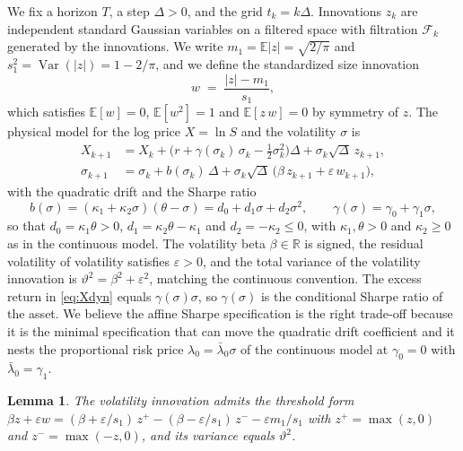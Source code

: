 \documentclass[11pt]{article}
\newtheorem{lemma}[theorem]{Lemma}
\theoremstyle{remark}
\newcommand{\E}{\mathbb{E}}
\newcommand{\R}{\mathbb{R}}
\newcommand{\Dt}{\Delta}
\begin{document}
We fix a horizon $T$, a step $\Dt>0$, and the grid $t_k=k\Dt$.
Innovations $z_{k}$ are independent standard Gaussian variables on a
filtered space with filtration $\mathcal{F}_k$ generated by the
innovations.
We write $m_1=\E|z|=\sqrt{2/\pi}$ and
$s_1^2=\operatorname{Var}(|z|)=1-2/\pi$, and we define the standardized
size innovation
\begin{equation}\label{eq:w}
w \;=\; \frac{|z|-m_1}{s_1},
\end{equation}
which satisfies $\E[w]=0$, $\E[w^2]=1$ and $\E[z\,w]=0$ by symmetry of $z$.
The physical model for the log price $X=\ln S$ and the volatility $\sigma$
is
\begin{align}
X_{k+1}&=X_k+\Big(r+\gamma(\sigma_k)\,\sigma_k
-\tfrac{1}{2}\sigma_k^2\Big)\Dt+\sigma_k\sqrt{\Dt}\,z_{k+1},
\label{eq:Xdyn}\\
\sigma_{k+1}&=\sigma_k+b(\sigma_k)\,\Dt
+\sigma_k\sqrt{\Dt}\,\big(\beta\,z_{k+1}+\varepsilon\,w_{k+1}\big),
\label{eq:sigdyn}
\end{align}
with the quadratic drift and the Sharpe ratio
\begin{equation}\label{eq:drift}
b(\sigma)=(\kappa_1+\kappa_2\sigma)(\theta-\sigma)
=d_0+d_1\sigma+d_2\sigma^2,
\qquad
\gamma(\sigma)=\gamma_0+\gamma_1\sigma ,
\end{equation}
so that $d_0=\kappa_1\theta>0$, $d_1=\kappa_2\theta-\kappa_1$ and
$d_2=-\kappa_2\le0$, with $\kappa_1,\theta>0$ and $\kappa_2\ge0$ as in the
continuous model.
The volatility beta $\beta\in\R$ is signed, the residual volatility of
volatility satisfies $\varepsilon>0$, and the total variance of the
volatility innovation is $\vartheta^2=\beta^2+\varepsilon^2$, matching the
continuous convention.
The excess return in \eqref{eq:Xdyn} equals $\gamma(\sigma)\sigma$, so
$\gamma(\sigma)$ is the conditional Sharpe ratio of the asset.
We believe the affine Sharpe specification is the right trade-off because
it is the minimal specification that can move the quadratic drift
coefficient and it nests the proportional risk price
$\lambda_0=\bar\lambda_0\sigma$ of the continuous model at $\gamma_0=0$
with $\bar\lambda_0=\gamma_1$.

\begin{lemma}\label{lem:innov}
The volatility innovation admits the threshold form
$\beta z+\varepsilon w
=(\beta+\varepsilon/s_1)\,z^{+}-(\beta-\varepsilon/s_1)\,z^{-}
-\varepsilon m_1/s_1$
with $z^{+}=\max(z,0)$ and $z^{-}=\max(-z,0)$, and its variance equals
$\vartheta^2$.
\end{lemma}
\end{document}
